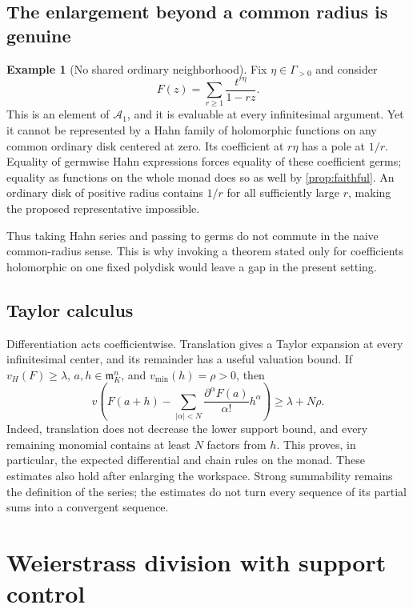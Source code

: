 \documentclass[11pt,letterpaper]{article}
\theoremstyle{definition}
\newtheorem{example}[example]{Example}
\theoremstyle{remark}
\newcommand{\A}{\mathscr A}
\newcommand{\m}{\mathfrak m}
\newcommand{\vH}{v_{\!H}}
\newcommand{\vmin}{v_{\min}}
\numberwithin{equation}{section}
\begin{document}
\subsection{The enlargement beyond a common radius is genuine}
\begin{example}[No shared ordinary neighborhood]\label{ex:no-radius}
Fix $\eta\in\Gamma_{>0}$ and consider
\begin{equation}\label{eq:no-radius}
 F(z)=\sum_{r\ge1}\frac{t^{r\eta}}{1-rz}.
\end{equation}
This is an element of $\A_1$, and it is evaluable at every infinitesimal argument. Yet it cannot be represented by a Hahn family of holomorphic functions on any common ordinary disk centered at zero. Its coefficient at $r\eta$ has a pole at $1/r$. Equality of germwise Hahn expressions forces equality of these coefficient germs; equality as functions on the whole monad does so as well by \cref{prop:faithful}. An ordinary disk of positive radius contains $1/r$ for all sufficiently large $r$, making the proposed representative impossible.
\end{example}

Thus taking Hahn series and passing to germs do not commute in the naive common-radius sense. This is why invoking a theorem stated only for coefficients holomorphic on one fixed polydisk would leave a gap in the present setting.

\subsection{Taylor calculus}
Differentiation acts coefficientwise. Translation gives a Taylor expansion at every infinitesimal center, and its remainder has a useful valuation bound. If $\vH(F)\ge\lambda$, $a,h\in\m_K^n$, and $\vmin(h)=\rho>0$, then
\begin{equation}\label{eq:taylor-bound}
 v\left(F(a+h)-\sum_{|\alpha|<N}
 \frac{\partial^\alpha F(a)}{\alpha!}h^\alpha\right)
 \ge\lambda+N\rho.
\end{equation}
Indeed, translation does not decrease the lower support bound, and every remaining monomial contains at least $N$ factors from $h$. This proves, in particular, the expected differential and chain rules on the monad. These estimates also hold after enlarging the workspace. Strong summability remains the definition of the series; the estimates do not turn every sequence of its partial sums into a convergent sequence.

\section{Weierstrass division with support control}\label{sec:division}
\end{document}
